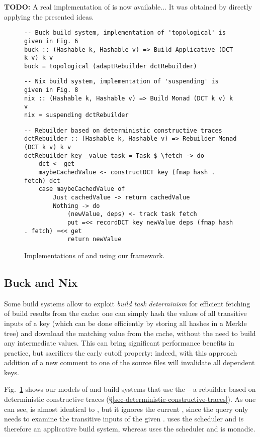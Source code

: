 \textbf{TODO:} A real implementation of \Cloud \Shake is now available... It was
obtained by directly applying the presented ideas.

\begin{figure}
\begin{verbatim}
-- Buck build system, implementation of 'topological' is given in Fig. 6
buck :: (Hashable k, Hashable v) => Build Applicative (DCT k v) k v
buck = topological (adaptRebuilder dctRebuilder)
\end{verbatim}
\vspace{1mm}
\begin{verbatim}
-- Nix build system, implementation of 'suspending' is given in Fig. 8
nix :: (Hashable k, Hashable v) => Build Monad (DCT k v) k v
nix = suspending dctRebuilder
\end{verbatim}
\vspace{1mm}
\begin{verbatim}
-- Rebuilder based on deterministic constructive traces
dctRebuilder :: (Hashable k, Hashable v) => Rebuilder Monad (DCT k v) k v
dctRebuilder key _value task = Task $ \fetch -> do
    dct <- get
    maybeCachedValue <- constructDCT key (fmap hash . fetch) dct
    case maybeCachedValue of
        Just cachedValue -> return cachedValue
        Nothing -> do
            (newValue, deps) <- track task fetch
            put =<< recordDCT key newValue deps (fmap hash . fetch) =<< get
            return newValue
\end{verbatim}
\vspace{-2mm}
\caption{Implementations of \Buck and \Nix using our framework.}
\label{fig-buck-nix-implementation}
\vspace{-2mm}
\end{figure}

\subsection{Buck and Nix}

Some build systems allow to exploit \emph{build task determinism} for efficient
fetching of build results from the cache: one can simply hash the values of all
transitive inputs of a key (which can be done efficiently by storing all hashes
in a Merkle tree) and download the matching value from the cache, without the
need to build any intermediate values. This can bring significant performance
benefits in practice, but sacrifices the early cutoff property: indeed, with
this approach addition of a new comment to one of the source files will
invalidate all dependent keys.

Fig.~\ref{fig-buck-nix-implementation} shows our models of \Buck and \Nix build
systems that use the  -- a rebuilder based on deterministic
constructive traces (\S\ref{sec-deterministic-constructive-traces}). As one can
see,  is almost identical to , but it ignores
the current , since the  query only needs to examine
the transitive inputs of the given . \Buck uses the 
scheduler and is therefore an applicative build system, whereas \Nix uses the
 scheduler and is monadic.
